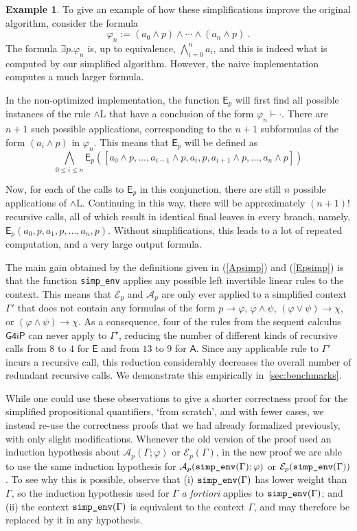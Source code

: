 \documentclass[english,final]{jflart}
\theoremstyle{definition}
\newtheorem{example}[definition]{Example}
\theoremstyle{plain}
\newcommand{\simpenv}[1]{\mbox{\texttt{simp\_env}}(#1)}
\newcommand{\Ep}[1]{\mathsf{E}_{p}(#1)}
\renewcommand{\phi}{\varphi}
\newcommand{\Gfourip}{\mathsf{G4iP}}
\begin{document}
\begin{example}
	To give an example of how these simplifications improve the original algorithm, consider the formula
$$
	\phi_n := {(a_0 \wedge p) \wedge \cdots \wedge(a_n \wedge p)}\ .
$$
The formula $\exists p. \phi_n$ is, up to equivalence, $\bigwedge_{i=0}^n a_i$, and this is indeed what is computed by our simplified algorithm. However, the naive implementation computes a much larger formula.

In the non-optimized implementation, the function $\mathsf{E}_p$ will first find all possible instances of the rule ${\wedge \mathrm L}$ that have a conclusion of the form $\phi_n \vdash \cdot$. There are $n+1$ such possible applications, corresponding to the $n+1$ subformulas of the form $(a_i \wedge p)$ in $\phi_n$. This means that $\mathsf{E}_p$ will be defined as
$$\bigwedge_{0\le i\le n} \Ep{[a_0 \wedge p, \dots, a_{i-1} \wedge p, a_i, p , a_{i+1} \wedge p, \dots, a_n \wedge p]}$$

Now, for each of the calls to $\mathsf{E}_p$ in this conjunction, there are still $n$ possible applications of ${\wedge \mathrm L}$. Continuing in this way, there will be approximately $(n+1)!$ recursive calls, all of which result in identical final leaves in every branch, namely, $\Ep{a_0, p, a_1, p, \dots, a_n, p}$. Without simplifications, this leads to a lot of repeated computation, and a very large output formula.
\end{example}
The main gain obtained by the definitions given in (\ref{Apsimp}) and (\ref{Epsimp}) is that the function \texttt{simp\_env} applies any possible left invertible linear rules to the context. This means that $\mathcal{E}_p$ and $\mathcal{A}_p$ are only ever applied to a simplified context $\Gamma'$ that does not contain any formulas of the form $p \to \phi$, $\phi \wedge \psi$, $(\phi \vee \psi) \to \chi$, or $(\phi \wedge \psi) \to \chi$. As a consequence, four of the rules from the sequent calculus $\Gfourip$ can never apply to $\Gamma'$, reducing the number of different kinds of recursive calls from $8$ to $4$ for $\mathsf{E}$ and from $13$ to $9$ for $\mathsf{A}$. Since any applicable rule to $\Gamma'$ incurs a recursive call, this reduction considerably decreases the overall number of redundant recursive calls. We demonstrate this empirically in~\cref{sec:benchmarks}.

While one could use these observations to give a shorter correctness proof for the simplified propositional quantifiers, `from scratch', and with fewer cases, we instead re-use the correctness proofs that we had already formalized previously, with only slight modifications. Whenever the old version of the proof used an induction hypothesis about $\mathcal{A}_p(\Gamma; \phi)$ or $\mathcal{E}_p(\Gamma)$, in the new proof we are able to use the same induction hypothesis for $\mathcal{A}_p(\simpenv{\Gamma}; \phi)$ or $\mathcal{E}_p(\simpenv{\Gamma})$. To see why this is possible, observe that (i) $\simpenv{\Gamma}$ has lower weight than $\Gamma$, so the induction hypothesis used for $\Gamma$ \emph{a fortiori}  applies to $\simpenv{\Gamma}$; and (ii) the context $\simpenv{\Gamma}$ is equivalent to the context $\Gamma$, and may therefore be replaced by it in any hypothesis.
\end{document}
